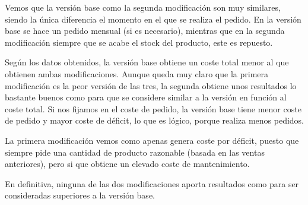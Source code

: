 Vemos que la versión base como la segunda modificación son muy similares, siendo la única diferencia el momento en el que se realiza el pedido. En la versión base se hace un pedido mensual (si es necesario), mientras que en la segunda modificación siempre que se acabe el stock del producto, este es repuesto.

Según los datos obtenidos, la versión base obtiene un coste total menor al que obtienen ambas modificaciones. Aunque queda muy claro que la primera modificación es la peor versión de las tres, la segunda obtiene unos resultados lo bastante buenos como para que se considere similar a la versión en función al coste total. Si nos fijamos en el coste de pedido, la versión base tiene menor coste de pedido y mayor coste de déficit, lo que es lógico, porque realiza menos pedidos.

La primera modificación vemos como apenas genera coste por déficit, puesto que siempre pide una cantidad de producto razonable (basada en las ventas anteriores), pero si que obtiene un elevado coste de mantenimiento.

En definitiva, ninguna de las dos modificaciones aporta resultados como para ser consideradas superiores a la versión base.
